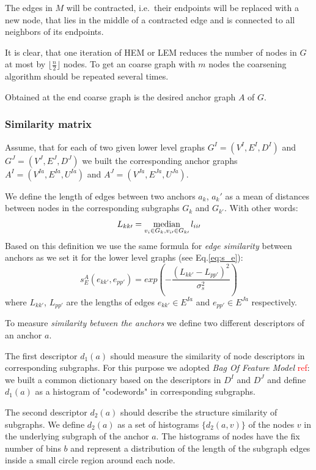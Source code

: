 \documentclass[
	fontsize=12pt,
	paper=a4,
	twoside=false,
	numbers=noenddot,
	plainheadsepline,
	toc=listof,
	toc=bibliography
]{scrartcl}
\def\median{\mathop{\rm median}} 						%
\newcommand\ToDo[1]{\textcolor{red}{#1}}
\begin{document}
The edges in $M$ will be contracted, i.e.\ their endpoints will be replaced with a new node, that lies in the middle of a contracted edge and is connected to all neighbors of its endpoints.

It is clear, that one iteration of HEM or LEM reduces the number of nodes in $G$ at most by $\lfloor\frac{n}{2} \rfloor$ nodes. To get an coarse graph with $m$ nodes the coarsening algorithm should be repeated several times.

Obtained at the end coarse graph is the desired anchor graph $A$ of $G$. 

\subsubsection{Similarity matrix}

Assume, that for each of two given lower level graphs $G^I = (V^I, E^I, D^I)$ and $G^J=(V^J, E^J, D^J)$ we built the corresponding anchor graphs  $A^I=(V^{Ia},E^{Ia}, U^{Ia})$ and $A^J=(V^{Ja},E^{Ja},U^{Ja})$. 

We define the length of edges between two anchors $a_k$, $a_k\prime$ as a mean of distances between nodes in the corresponding subgraphs $G_k$ and $G_{k\prime}$. With other words:
\begin{equation} L_{kk\prime} = \median_{v_i\in G_k, v_{i\prime}\in G_{k\prime}} l_{ii\prime} \end{equation}
Based on this definition we use the same formula for \emph{edge similarity} between anchors as we set it for the lower level graphs (see Eq.\ref{eq:s_e}):
\begin{equation} 
s^A_E(e_{kk\prime}, e_{pp\prime}) = exp(-\frac{(L_{kk\prime} - L_{pp\prime})^2}{\sigma^2_{s}})
\label{eq:s_e_A}
\end{equation}
where $L_{kk\prime}$, $L_{pp\prime} $ are the lengths of edges $e_{kk\prime}\in E^{Ia}$ and $e_{pp\prime}\in E^{Ja}$ respectively.

To measure \emph{similarity between the anchors} we  define two different descriptors of an anchor $a$.

The first descriptor $d_1(a)$ should measure the similarity of node descriptors in corresponding subgraphs. For this purpose we adopted \emph{Bag Of Feature Model} \ToDo{ref}: we built a common dictionary based on the descriptors in $D^I$ and $D^J$ and define $d_1(a)$ as a histogram of "codewords" in corresponding subgraphs.

The second descriptor $d_2(a)$ should describe the structure similarity of subgraphs. We define $d_2(a)$ as a set of histograms $\{d_2(a,v)\}$ of the nodes $v$ in the underlying subgraph of the anchor $a$. The histograms of nodes have the fix number of bins $b$ and represent a distribution of the length of the subgraph edges inside a small circle region around each node. 
\end{document}
